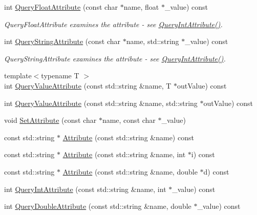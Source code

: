 \begin{DoxyCompactItemize}
int \hyperlink{class_ti_xml_element_aa04d3af11601ef5a5f88295203a843be}{Query\-Float\-Attribute} (const char $\ast$name, float $\ast$\-\_\-value) const 
\begin{DoxyCompactList}\small\item\em Query\-Float\-Attribute examines the attribute -\/ see \hyperlink{class_ti_xml_element_aea0bfe471380f281c5945770ddbf52b9}{Query\-Int\-Attribute()}. \end{DoxyCompactList}\item 
int \hyperlink{class_ti_xml_element_a14321ac360efe906ed449d9db3fd9961}{Query\-String\-Attribute} (const char $\ast$name, std\-::string $\ast$\-\_\-value) const 
\begin{DoxyCompactList}\small\item\em Query\-String\-Attribute examines the attribute -\/ see \hyperlink{class_ti_xml_element_aea0bfe471380f281c5945770ddbf52b9}{Query\-Int\-Attribute()}. \end{DoxyCompactList}\item 
{\footnotesize template$<$typename T $>$ }\\int \hyperlink{class_ti_xml_element_a676f888438f8eb8d69a695ead195edb8}{Query\-Value\-Attribute} (const std\-::string \&name, T $\ast$out\-Value) const 
\item 
int \hyperlink{class_ti_xml_element_a93fb47dab50d5f0d2912b789648c48ca}{Query\-Value\-Attribute} (const std\-::string \&name, std\-::string $\ast$out\-Value) const 
\item 
void \hyperlink{class_ti_xml_element_abf0b3bd7f0e4c746a89ec6e7f101fc32}{Set\-Attribute} (const char $\ast$name, const char $\ast$\-\_\-value)
\item 
const std\-::string $\ast$ \hyperlink{class_ti_xml_element_a83b8b18d6ca253649ce378f8f5a2da49}{Attribute} (const std\-::string \&name) const 
\item 
const std\-::string $\ast$ \hyperlink{class_ti_xml_element_aac36701ac5de73e9ef8c0b1d128e7782}{Attribute} (const std\-::string \&name, int $\ast$i) const 
\item 
const std\-::string $\ast$ \hyperlink{class_ti_xml_element_a7131fe25a7e512f52ffa27518e108b7e}{Attribute} (const std\-::string \&name, double $\ast$d) const 
\item 
int \hyperlink{class_ti_xml_element_ad79cb2416a5b94784f9a517add7e2d6d}{Query\-Int\-Attribute} (const std\-::string \&name, int $\ast$\-\_\-value) const 
\item 
int \hyperlink{class_ti_xml_element_a157250e0c0303657d911f6991106ba73}{Query\-Double\-Attribute} (const std\-::string \&name, double $\ast$\-\_\-value) const 

\end{DoxyCompactItemize}
